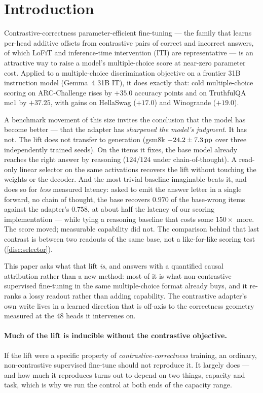 \section{Introduction}\label{sec:intro}

Contrastive-correctness parameter-efficient fine-tuning --- the family that learns
per-head additive offsets from contrastive pairs of correct and incorrect answers,
of which LoFiT \citep{LoFiT} and inference-time intervention (ITI) \citep{ITI} are
representative --- is an attractive way to raise a model's multiple-choice score at
near-zero parameter cost. Applied to a multiple-choice discrimination objective on a
frontier 31B instruction model (Gemma~4 31B IT), it does exactly that: cold
multiple-choice scoring on ARC-Challenge rises by $+35.0$ accuracy points and on
TruthfulQA mc1 by $+37.25$, with gains on HellaSwag ($+17.0$) and Winogrande
($+19.0$).

A benchmark movement of this size invites the conclusion that the model has become
better --- that the adapter has \emph{sharpened the model's judgment}. It has not.
The lift does not transfer to generation (gsm8k $-24.2 \pm 7.3\,\mathrm{pp}$ over three
independently trained seeds). On the items it fixes, the base model already reaches
the right answer by reasoning ($124/124$ under chain-of-thought). A read-only linear
selector on the same activations recovers the lift without touching the weights or the
decoder. And the most trivial baseline imaginable beats it, and does so for
\emph{less} measured latency:
asked to emit the answer letter in a single forward, no chain of thought, the base
recovers $0.970$ of the base-wrong items against the adapter's $0.758$, at about half
the latency of our scoring implementation --- while tying a reasoning baseline that
costs some $150\times$ more. The score moved; measurable capability did not. The
comparison behind that last contrast is between two readouts of the same base, not
a like-for-like scoring test (\cref{disc:selector}).

This paper asks what that lift \emph{is}, and answers with a quantified causal
attribution rather than a new method: most of it is what non-contrastive supervised
fine-tuning in the same multiple-choice format
already buys, and it re-ranks a lossy readout rather than adding capability. The
contrastive adapter's own write lives in a learned direction that is off-axis to the
correctness geometry measured at the 48 heads it intervenes on.

\paragraph{Much of the lift is inducible without the contrastive objective.}
If the lift were a specific property of \emph{contrastive-correctness} training, an
ordinary, non-contrastive supervised fine-tune should not reproduce it. It largely
does --- and how much it reproduces turns out to depend on two things, capacity and
task, which is why we run the control at both ends of the capacity range.


